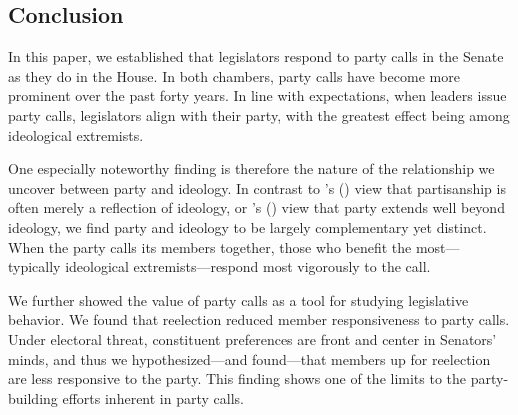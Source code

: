 \documentclass[12pt]{article}
\def\citeapos#1{\citeauthor{#1}'s (\citeyear{#1})} %
\begin{document}
\subsection*{Conclusion}

In this paper, we established that legislators respond to party calls in the Senate as they do in the House. In both chambers, party calls have become more prominent over the past forty years.  In line with expectations, when leaders issue party calls, legislators align with their party, with the greatest effect being among ideological extremists.

One especially noteworthy finding is therefore the nature of the relationship we uncover between party and ideology.  In contrast to \citeapos{Krehbiel:1993} view that partisanship is often merely a reflection of ideology, or \citeapos{Lee:2009} view that party extends well beyond ideology, we find party and ideology to be largely complementary yet distinct.  When the party calls its members together, those who benefit the most---typically ideological extremists---respond most vigorously to the call.

We further showed the value of party calls as a tool for studying legislative behavior.  We found that reelection reduced member responsiveness to party calls.  Under electoral threat, constituent preferences are front and center in Senators' minds, and thus we hypothesized---and found---that members up for reelection are less responsive to the party. This finding shows one of the limits to the party-building efforts inherent in party calls.

\clearpage


\end{document}
